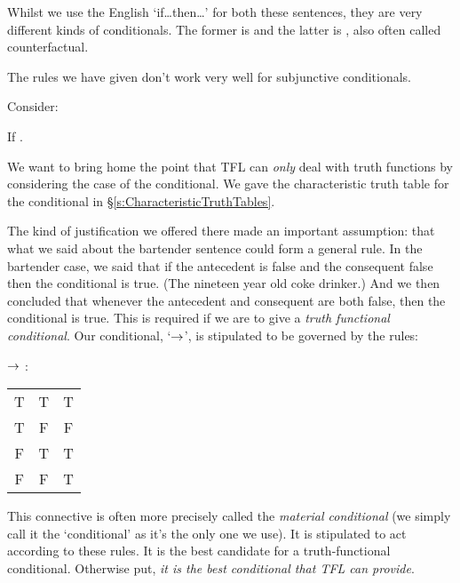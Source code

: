 Whilst we use the English `if\ldots then\ldots' for both these sentences, they are very different kinds of conditionals. The former is  and the latter is , also often called {counterfactual}.

The rules we have given don't work very well for subjunctive conditionals. 

Consider:
\begin{earg}
\item[\ex{subj}] If . 
\end{earg}






We want to bring home the point that TFL can \emph{only} deal with truth functions by considering the case of the conditional.
We gave the characteristic truth table for the conditional in \S\ref{s:CharacteristicTruthTables}.

The kind of justification we offered there made an important assumption: that what we said about the bartender sentence could form a general rule. In the bartender case, we said that if the antecedent is false and the consequent false then the conditional is true. (The nineteen year old coke drinker.) And we then concluded that whenever the antecedent and consequent are both false, then the conditional is true. This is required if we are to give a \emph{truth functional conditional}. Our conditional, `$\rightarrow$', is stipulated to be governed by the rules:
\begin{center}$\rightarrow$ :
\begin{tabular}{c@{, }c@{ $\leadsto$ }c}
T & T & T\\
T & F & F\\
F & T & T\\
F & F & T
\end{tabular}
\end{center}
This connective is often more precisely called the \emph{material conditional} (we simply call it the `conditional' as it's the only one we use). It is stipulated to act according to these rules.
It is the {best} candidate for a truth-functional conditional. Otherwise put, \emph{it is the best conditional that TFL can provide}.


